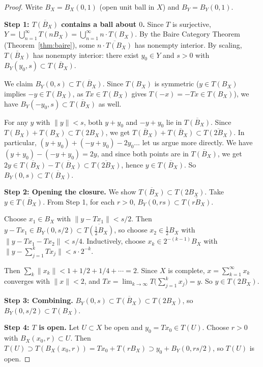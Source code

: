 \documentclass[11pt,a4paper]{article}
\begin{document}
\begin{proof}
Write $B_X = B_X(0,1)$ (open unit ball in $X$) and $B_Y = B_Y(0,1)$.

\textbf{Step 1: $\overline{T(B_X)}$ contains a ball about $0$.}
Since $T$ is surjective,
$Y = \bigcup_{n=1}^\infty T(nB_X) = \bigcup_{n=1}^\infty n \cdot T(B_X)$.
By the Baire Category Theorem (Theorem~\ref{thm:baire}), some
$\overline{n \cdot T(B_X)}$ has nonempty interior. By scaling,
$\overline{T(B_X)}$ has nonempty interior: there exist $y_0 \in Y$ and
$s > 0$ with $B_Y(y_0, s) \subset \overline{T(B_X)}$.

We claim $B_Y(0, s) \subset \overline{T(B_X)}$. Since $T(B_X)$ is
symmetric ($y \in T(B_X)$ implies $-y \in T(B_X)$, as $Tx \in T(B_X)$
gives $T(-x) = -Tx \in T(B_X)$), we have
$B_Y(-y_0, s) \subset \overline{T(B_X)}$ as well.

For any $y$ with $\|y\| < s$, both $y + y_0$ and $-y + y_0$ lie in
$\overline{T(B_X)}$. Since $T(B_X) + T(B_X) \subset T(2B_X)$, we get
$\overline{T(B_X)} + \overline{T(B_X)} \subset \overline{T(2B_X)}$.
In particular,
$(y + y_0) + (-y + y_0) - 2y_0$... let us argue more directly.
We have $(y + y_0) - (-y + y_0) = 2y$, and since both points are in
$\overline{T(B_X)}$, we get
$2y \in \overline{T(B_X)} - \overline{T(B_X)} \subset \overline{T(2B_X)}$,
hence $y \in \overline{T(B_X)}$. So $B_Y(0, s) \subset \overline{T(B_X)}$.

\textbf{Step 2: Opening the closure.} We show
$\overline{T(B_X)} \subset T(2B_X)$. Take $y \in \overline{T(B_X)}$.
From Step 1, for each $r > 0$,
$B_Y(0, rs) \subset \overline{T(rB_X)}$.

Choose $x_1 \in B_X$ with $\|y - Tx_1\| < s/2$. Then
$y - Tx_1 \in B_Y(0, s/2) \subset \overline{T(\tfrac{1}{2}B_X)}$, so
choose $x_2 \in \tfrac{1}{2}B_X$ with
$\|y - Tx_1 - Tx_2\| < s/4$. Inductively, choose
$x_k \in 2^{-(k-1)}B_X$ with
$\|y - \sum_{j=1}^k Tx_j\| < s \cdot 2^{-k}$.

Then $\sum_k \|x_k\| < 1 + 1/2 + 1/4 + \cdots = 2$. Since $X$ is
complete, $x = \sum_{k=1}^\infty x_k$ converges with $\|x\| < 2$, and
$Tx = \lim_{k \to \infty} T\bigl(\sum_{j=1}^k x_j\bigr) = y$. So
$y \in T(2B_X)$.

\textbf{Step 3: Combining.}
$B_Y(0, s) \subset \overline{T(B_X)} \subset T(2B_X)$, so
$B_Y(0, s/2) \subset T(B_X)$.

\textbf{Step 4: $T$ is open.} Let $U \subset X$ be open and
$y_0 = Tx_0 \in T(U)$. Choose $r > 0$ with $B_X(x_0, r) \subset U$.
Then
$T(U) \supset T(B_X(x_0, r)) = Tx_0 + T(rB_X)
\supset y_0 + B_Y(0, rs/2)$, so $T(U)$ is open.
\end{proof}
\end{document}
